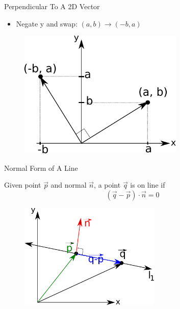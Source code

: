 \documentclass{beamer}
\begin{document}
\begin{frame}{Perpendicular To A 2D Vector}
\begin{itemize}[label=$\vartriangleright$]
    \item Negate y and swap: $(a, b) \rightarrow (-b, a)$
\end{itemize}

\begin{figure}[t]
	\centering
	\includegraphics[width=0.7\textwidth]{VectorPerp.pdf}
\end{figure}

\end{frame}



\begin{frame}{Normal Form of A Line}

Given point $\vec{p}$ and normal $\vec{n}$, a point $\vec{q}$ is on line if
\[ (\vec{q} - \vec{p}) \cdot \vec{n} = 0 \]

\begin{figure}[t]
	\centering
	\includegraphics[width=0.6\textwidth]{LineNormalForm.pdf}
\end{figure}

\end{frame}
\end{document}
